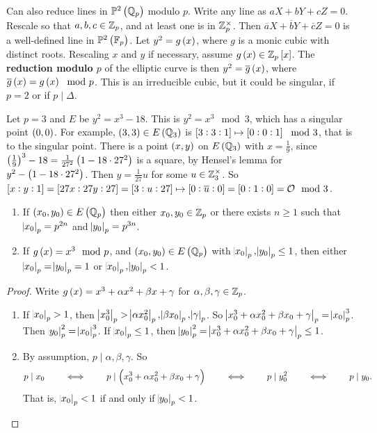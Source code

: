 Can also reduce lines in $ \PP^2\br{\QQ_p} $ modulo $ p $. Write any line as $ aX + bY + cZ = 0 $. Rescale so that $ a, b, c \in \mathbb{Z}_p $, and at least one is in $ \mathbb{Z}_p^\times $. Then $ \overline{a}X + \overline{b}Y + \overline{c}Z = 0 $ is a well-defined line in $ \PP^2\br{\FF_p} $. Let $ y^2 = g\br{x} $, where $ g $ is a monic cubic with distinct roots. Rescaling $ x $ and $ y $ if necessary, assume $ g\br{x} \in \ZZ_p\sbr{x} $. The \textbf{reduction modulo $ p $} of the elliptic curve is then $ y^2 = \overline{g}\br{x} $, where $ \overline{g}\br{x} = g\br{x} \mod p $. This is an irreducible cubic, but it could be singular, if $ p = 2 $ or if $ p \mid \Delta $.

\begin{example}
Let $ p = 3 $ and $ E $ be $ y^2 = x^3 - 18 $. This is $ y^2 = x^3 \mod 3 $, which has a singular point $ \br{0, 0} $. For example, $ \br{3, 3} \in E\br{\QQ_3} $ is $ \sbr{3 : 3 : 1} \mapsto \sbr{0 : 0 : 1} \mod 3 $, that is to the singular point. There is a point $ \br{x, y} $ on $ E\br{\QQ_3} $ with $ x = \tfrac{1}{9} $, since $ \br{\tfrac{1}{9}}^3 - 18 = \tfrac{1}{27^2}\br{1 - 18 \cdot 27^2} $ is a square, by Hensel's lemma for $ y^2 - \br{1 - 18 \cdot 27^2} $. Then $ y = \tfrac{1}{27}u $ for some $ u \in \mathbb{Z}_3^\times $. So $ \sbr{x : y : 1} = \sbr{27x : 27y : 27} = \sbr{3 : u : 27} \mapsto \sbr{0 : \overline{u} : 0} = \sbr{0 : 1 : 0} = \OOO \mod 3 $.
\end{example}

\begin{lemma}
\hfill
\begin{enumerate}
\item If $ \br{x_0, y_0} \in E\br{\QQ_p} $ then either $ x_0, y_0 \in \mathbb{Z}_p $ or there exists $ n \ge 1 $ such that $ \abs{x_0}_p = p^{2n} $ and $ \abs{y_0}_p = p^{3n} $.
\item If $ g\br{x} = x^3 \mod p $, and $ \br{x_0, y_0} \in E\br{\QQ_p} $ with $ \abs{x_0}_p, \abs{y_0}_p \le 1 $, then either $ \abs{x_0}_p = \abs{y_0}_p = 1 $ or $ \abs{x_0}_p, \abs{y_0}_p < 1 $.
\end{enumerate}
\end{lemma}

\begin{proof}
Write $ g\br{x} = x^3 + \alpha x^2 + \beta x + \gamma $ for $ \alpha, \beta, \gamma \in \mathbb{Z}_p $.
\begin{enumerate}
\item If $ \abs{x_0}_p > 1 $, then $ \abs{x_0^3}_p > \abs{\alpha x_0^2}_p, \abs{\beta x_0}_p, \abs{\gamma}_p $. So $ \abs{x_0^3 + \alpha x_0^2 + \beta x_0 + \gamma}_p = \abs{x_0}_p^3 $. Then $ \abs{y_0}_p^2 = \abs{x_0}_p^3 $. If $ \abs{x_0}_p \le 1 $, then $ \abs{y_0}_p^2 = \abs{x_0^3 + \alpha x_0^2 + \beta x_0 + \gamma}_p \le 1 $.
\item By assumption, $ p \mid \alpha, \beta, \gamma $. So
$$ p \mid x_0 \qquad \iff \qquad p \mid \br{x_0^3 + \alpha x_0^2 + \beta x_0 + \gamma} \qquad \iff \qquad p \mid y_0^2 \qquad \iff \qquad p \mid y_0. $$
That is, $ \abs{x_0}_p < 1 $ if and only if $ \abs{y_0}_p < 1 $.
\end{enumerate}
\end{proof}

